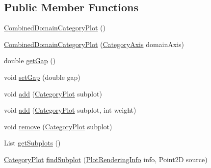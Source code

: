 \subsection*{Public Member Functions}
\begin{DoxyCompactItemize}
\item 
\mbox{\hyperlink{classorg_1_1jfree_1_1chart_1_1plot_1_1_combined_domain_category_plot_afa7e0de4ae1afd5b80883b005b47ab44}{Combined\+Domain\+Category\+Plot}} ()
\item 
\mbox{\hyperlink{classorg_1_1jfree_1_1chart_1_1plot_1_1_combined_domain_category_plot_acccfc6581d8ba7d05e4c2d08713c65cd}{Combined\+Domain\+Category\+Plot}} (\mbox{\hyperlink{classorg_1_1jfree_1_1chart_1_1axis_1_1_category_axis}{Category\+Axis}} domain\+Axis)
\item 
double \mbox{\hyperlink{classorg_1_1jfree_1_1chart_1_1plot_1_1_combined_domain_category_plot_a6316f0e91e8db920b189872374719969}{get\+Gap}} ()
\item 
void \mbox{\hyperlink{classorg_1_1jfree_1_1chart_1_1plot_1_1_combined_domain_category_plot_a5d3f10078a53b2b557c02884c04b8615}{set\+Gap}} (double gap)
\item 
void \mbox{\hyperlink{classorg_1_1jfree_1_1chart_1_1plot_1_1_combined_domain_category_plot_a42e1a292a2f83acd218a2719edfbb30f}{add}} (\mbox{\hyperlink{classorg_1_1jfree_1_1chart_1_1plot_1_1_category_plot}{Category\+Plot}} subplot)
\item 
void \mbox{\hyperlink{classorg_1_1jfree_1_1chart_1_1plot_1_1_combined_domain_category_plot_afb7d4a9618b1a645786e8874fbdc4c54}{add}} (\mbox{\hyperlink{classorg_1_1jfree_1_1chart_1_1plot_1_1_category_plot}{Category\+Plot}} subplot, int weight)
\item 
void \mbox{\hyperlink{classorg_1_1jfree_1_1chart_1_1plot_1_1_combined_domain_category_plot_a426e9abb91d3cdd36b5d50e1f94f1759}{remove}} (\mbox{\hyperlink{classorg_1_1jfree_1_1chart_1_1plot_1_1_category_plot}{Category\+Plot}} subplot)
\item 
List \mbox{\hyperlink{classorg_1_1jfree_1_1chart_1_1plot_1_1_combined_domain_category_plot_acd560e7985b31b1a331620ca3684ee28}{get\+Subplots}} ()
\item 
\mbox{\hyperlink{classorg_1_1jfree_1_1chart_1_1plot_1_1_category_plot}{Category\+Plot}} \mbox{\hyperlink{classorg_1_1jfree_1_1chart_1_1plot_1_1_combined_domain_category_plot_aef2c18af52f7b69d9259de4ad074425d}{find\+Subplot}} (\mbox{\hyperlink{classorg_1_1jfree_1_1chart_1_1plot_1_1_plot_rendering_info}{Plot\+Rendering\+Info}} info, Point2D source)
\item 

\end{DoxyCompactItemize}
